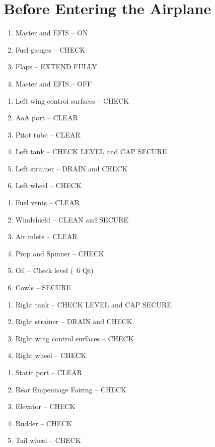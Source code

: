 \section{Before Entering the Airplane}
\begin{enumerate}[(1)]
\item Master and EFIS -- ON
\item Fuel gauges -- CHECK
\item Flaps -- EXTEND FULLY
\item Master and EFIS -- OFF
\end{enumerate} 	
\begin{enumerate}[(1)]
\item Left wing control surfaces -- CHECK
\item AoA port -- CLEAR
\item Pitot tube -- CLEAR
\item Left tank -- CHECK LEVEL and CAP SECURE
\item Left strainer -- DRAIN and CHECK
\item Left wheel -- CHECK
\end{enumerate}
\begin{enumerate}[(1)]
\item Fuel vents -- CLEAR
\item Windshield -- CLEAN and SECURE
\item Air inlets -- CLEAR
\item Prop and Spinner -- CHECK
\item Oil -- Check level (~6 Qt)
\item Cowls -- SECURE
\end{enumerate}
\begin{enumerate}[(1)]
\item Right tank -- CHECK LEVEL and CAP SECURE
\item Right strainer -- DRAIN and CHECK
\item Right wing control surfaces -- CHECK
\item Right wheel -- CHECK 
\end{enumerate}
\begin{enumerate}[(1)]
\item Static port -- CLEAR
\item Rear Empennage Fairing -- CHECK
\item Elevator -- CHECK
\item Rudder -- CHECK
\item Tail wheel -- CHECK
\end{enumerate}

